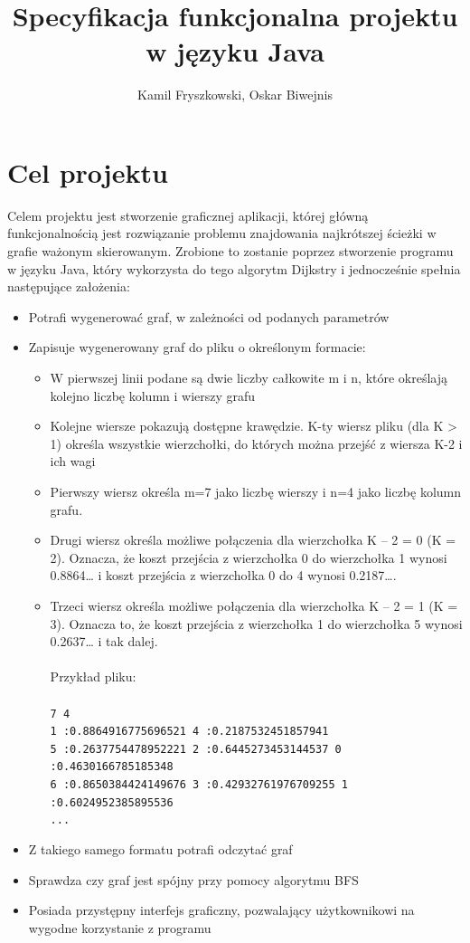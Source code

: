 \documentclass{article}
\title{Specyfikacja funkcjonalna projektu w języku Java}
\author{Kamil Fryszkowski, Oskar Biwejnis}
\begin{document}
\maketitle
\thispagestyle{fancy}

\section{Cel projektu}
Celem projektu jest stworzenie graficznej aplikacji, której główną funkcjonalnością jest rozwiązanie problemu znajdowania najkrótszej ścieżki w grafie ważonym skierowanym.
Zrobione to zostanie poprzez stworzenie programu w języku Java, który wykorzysta do tego algorytm Dijkstry i jednocześnie spełnia następujące założenia:
\begin{itemize}
\item Potrafi wygenerować graf, w zależności od podanych parametrów
\item Zapisuje wygenerowany graf do pliku o określonym formacie:
\begin{itemize}
\item W pierwszej linii podane są dwie liczby całkowite m i n, które określają kolejno liczbę kolumn i wierszy grafu
\item Kolejne wiersze pokazują dostępne krawędzie. K-ty wiersz pliku (dla K > 1) określa wszystkie wierzchołki, do których można przejść z wiersza K-2 i ich wagi

\item Pierwszy wiersz określa m=7 jako liczbę wierszy i n=4 jako liczbę kolumn grafu.
\item Drugi wiersz określa możliwe połączenia dla wierzchołka K – 2 = 0 (K = 2). Oznacza, że koszt przejścia z wierzchołka 0 do wierzchołka 1 wynosi 0.8864… i koszt przejścia z wierzchołka 0 do 4 wynosi 0.2187….
\item Trzeci wiersz określa możliwe połączenia dla wierzchołka K – 2 = 1 (K = 3). Oznacza to, że koszt przejścia z wierzchołka 1 do wierzchołka 5 wynosi 0.2637… i tak dalej.\\
\\
Przykład pliku: \\\\
\texttt{\footnotesize 7 4\\
	 1 :0.8864916775696521  4 :0.2187532451857941 \\
	 5 :0.2637754478952221  2 :0.6445273453144537  0 :0.4630166785185348 \\
	 6 :0.8650384424149676  3 :0.42932761976709255  1 :0.6024952385895536 \\
     ...\\}
\end{itemize}
\item Z takiego samego formatu potrafi odczytać graf
\item Sprawdza czy graf jest spójny przy pomocy algorytmu BFS
\item Posiada przystępny interfejs graficzny, pozwalający użytkownikowi na wygodne korzystanie z programu
\end{itemize}
\end{document}
